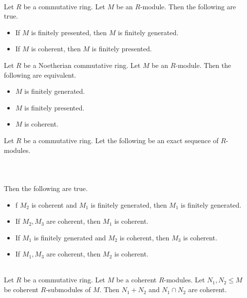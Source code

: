 \documentclass[a4paper]{article}
\begin{document}
\begin{lmm}{}{}\\
Let $R$ be a commutative ring. Let $M$ be an $R$-module. Then the following are true. 
\begin{itemize}
\item If $M$ is finitely presented, then $M$ is finitely generated. 
\item If $M$ is coherent, then $M$ is finitely presented. 
\end{itemize}
\end{lmm}

\begin{lmm}{}{} Let $R$ be a Noetherian commutative ring. Let $M$ be an $R$-module. Then the following are equivalent. 
\begin{itemize}
\item $M$ is finitely generated. 
\item $M$ is finitely presented. 
\item $M$ is coherent. 
\end{itemize}
\end{lmm}

\begin{prp}{}{} Let $R$ be a commutative ring. Let the following be an exact sequence of $R$-modules. \\~\\
\\~\\
Then the following are true. 
\begin{itemize}
\item f $M_2$ is coherent and $M_1$ is finitely generated, then $M_1$ is finitely generated. 
\item If $M_2,M_3$ are coherent, then $M_1$ is coherent. 
\item If $M_1$ is finitely generated and $M_2$ is coherent, then $M_3$ is coherent. 
\item If $M_1,M_3$ are coherent, then $M_2$ is coherent. 
\end{itemize}
\end{prp}

\begin{lmm}{}{}\\
Let $R$ be a commutative ring. Let $M$ be a coherent $R$-modules. Let $N_1,N_2\leq M$ be coherent $R$-submodules of $M$. Then $N_1+N_2$ and $N_1\cap N_2$ are coherent. 
\end{lmm}
\end{document}
